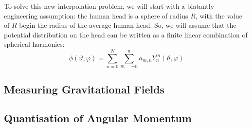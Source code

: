 To solve this new interpolation problem, we will start with a blatantly
engineering assumption: the human head is a sphere of radius $R$, with the value
of $R$ begin the radius of the average human head. So, we will assume that the
potential distribution on the head can be written as a finite linear combination
of spherical harmonics:
\begin{equation*}
  \phi(\vartheta, \varphi)
    = \sum_{n=0}^N \sum_{m=-n}^n a_{m,n} Y^m_n(\vartheta, \varphi)
\end{equation*}

\subsection{Measuring Gravitational Fields}

\subsection{Quantisation of Angular Momentum}
